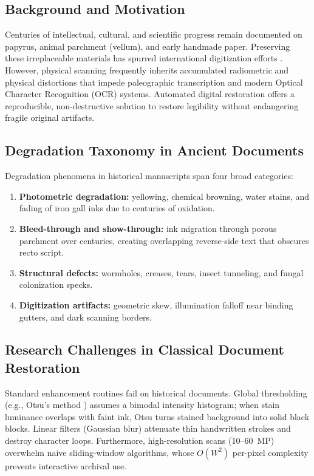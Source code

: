 \documentclass[11pt, a4paper]{article}
\begin{document}
\subsection{Background and Motivation}
Centuries of intellectual, cultural, and scientific progress remain documented on papyrus, animal parchment (vellum), and early handmade paper. Preserving these irreplaceable materials has spurred international digitization efforts \cite{pratikakis2019}. However, physical scanning frequently inherits accumulated radiometric and physical distortions that impede paleographic transcription and modern Optical Character Recognition (OCR) systems. Automated digital restoration offers a reproducible, non-destructive solution to restore legibility without endangering fragile original artifacts.

\subsection{Degradation Taxonomy in Ancient Documents}
Degradation phenomena in historical manuscripts span four broad categories:
\begin{enumerate}
    \item \textbf{Photometric degradation:} yellowing, chemical browning, water stains, and fading of iron gall inks due to centuries of oxidation.
    \item \textbf{Bleed-through and show-through:} ink migration through porous parchment over centuries, creating overlapping reverse-side text that obscures recto script.
    \item \textbf{Structural defects:} wormholes, creases, tears, insect tunneling, and fungal colonization specks.
    \item \textbf{Digitization artifacts:} geometric skew, illumination falloff near binding gutters, and dark scanning borders.
\end{enumerate}

\subsection{Research Challenges in Classical Document Restoration}
Standard enhancement routines fail on historical documents. Global thresholding (e.g., Otsu's method \cite{otsu1979}) assumes a bimodal intensity histogram; when stain luminance overlaps with faint ink, Otsu turns stained background into solid black blocks. Linear filters (Gaussian blur) attenuate thin handwritten strokes and destroy character loops. Furthermore, high-resolution scans (10--60~MP) overwhelm naive sliding-window algorithms, whose $O(W^2)$ per-pixel complexity prevents interactive archival use.
\end{document}
